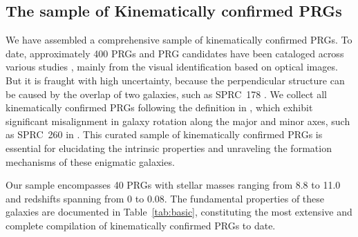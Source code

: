 \documentclass[twocolumn]{aastex631}
\begin{document}
\subsection{The sample of Kinematically confirmed PRGs}
\label{subsec:prg}

We have assembled a comprehensive sample of kinematically confirmed PRGs. To date, approximately 400 PRGs and PRG candidates have been cataloged across various studies \citep{Whitmore1987ApJ...314..439W, Whitmore1990AJ....100.1489W, Reshetnikov1995AA...303..398R, Cox1995NYASA.751...27C, Iodice2003ApJ...585..730I, Battinelli2006AA...451...99B, Moiseev2011MNRAS.418..244M, Merkulova2012AstBu..67..374M, Moiseev2014ASPC..486...71M, Reshetnikov2019MNRAS.483.1470R}, mainly from the visual identification based on optical images. But it is fraught with high uncertainty, because the perpendicular structure can be caused by the overlap of two galaxies, such as SPRC~178 \citep{Moiseev2011MNRAS.418..244M}. We collect all kinematically confirmed PRGs following the definition in \citet{Whitmore1990AJ....100.1489W}, which exhibit significant misalignment in galaxy rotation along the major and minor axes, such as SPRC~260 in \citet{Moiseev2014ASPC..486...71M}. This curated sample of kinematically confirmed PRGs is essential for elucidating the intrinsic properties and unraveling the formation mechanisms of these enigmatic galaxies. 

Our sample encompasses 40 PRGs with stellar masses ranging from 8.8 to 11.0 and redshifts spanning from 0 to 0.08. The fundamental properties of these galaxies are documented in Table~\ref{tab:basic}, constituting the most extensive and complete compilation of kinematically confirmed PRGs to date. 
\end{document}

